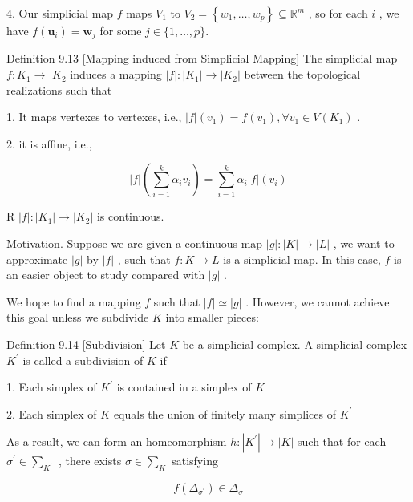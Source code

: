 4. Our simplicial map \(f\) maps \({V}_{1}\) to \({V}_{2} = \left\{  {{w}_{1},\ldots ,{w}_{p}}\right\}   \subseteq  {\mathbb{R}}^{m}\) , so for each \(i\) , we have \(f\left( {\mathbf{u}}_{i}\right)  = {\mathbf{w}}_{j}\) for some \(j \in  \{ 1,\ldots ,p\} .\)

Definition 9.13 [Mapping induced from Simplicial Mapping] The simplicial map \(f : {K}_{1} \rightarrow\)  \({K}_{2}\) induces a mapping \(\left| f\right|  : \left| {K}_{1}\right|  \rightarrow  \left| {K}_{2}\right|\) between the topological realizations such that

1. It maps vertexes to vertexes, i.e., \(\left| f\right| \left( {v}_{1}\right)  = f\left( {v}_{1}\right) ,\forall {v}_{1} \in  V\left( {K}_{1}\right)\) .

2. it is affine, i.e.,

\[
\left| f\right| \left( {\mathop{\sum }\limits_{{i = 1}}^{k}{\alpha }_{i}{v}_{i}}\right)  = \mathop{\sum }\limits_{{i = 1}}^{k}{\alpha }_{i}\left| f\right| \left( {v}_{i}\right)
\]

R \(\left| f\right|  : \left| {K}_{1}\right|  \rightarrow  \left| {K}_{2}\right|\) is continuous.

Motivation. Suppose we are given a continuous map \(\left| g\right|  : \left| K\right|  \rightarrow  \left| L\right|\) , we want to approximate \(\left| g\right|\) by \(\left| f\right|\) , such that \(f : K \rightarrow  L\) is a simplicial map. In this case, \(f\) is an easier object to study compared with \(\left| g\right|\) .

We hope to find a mapping \(f\) such that \(\left| f\right|  \simeq  \left| g\right|\) . However, we cannot achieve this goal unless we subdivide \(K\) into smaller pieces:

Definition 9.14 [Subdivision] Let \(K\) be a simplicial complex. A simplicial complex \({K}^{\prime }\) is called a subdivision of \(K\) if

1. Each simplex of \({K}^{\prime }\) is contained in a simplex of \(K\)

2. Each simplex of \(K\) equals the union of finitely many simplices of \({K}^{\prime }\)

As a result, we can form an homeomorphism \(h : \left| {K}^{\prime }\right|  \rightarrow  \left| K\right|\) such that for each \({\sigma }^{\prime } \in  {\sum }_{{K}^{\prime }}\) , there exists \(\sigma  \in  {\sum }_{K}\) satisfying

\[
f\left( {\Delta }_{{\sigma }^{\prime }}\right)  \in  {\Delta }_{\sigma }
\]

